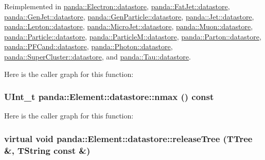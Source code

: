 Reimplemented in \hyperlink{structpanda_1_1Electron_1_1datastore_aca8cd939bbe2edf7b152348364b1ac4c}{panda::Electron::datastore}, \hyperlink{structpanda_1_1FatJet_1_1datastore_a83669574414333b1656878e0ec09c345}{panda::FatJet::datastore}, \hyperlink{structpanda_1_1GenJet_1_1datastore_a38a95477762b562ae4a6f2487e2c26ff}{panda::GenJet::datastore}, \hyperlink{structpanda_1_1GenParticle_1_1datastore_af83451f0c94efe8daeb7769571e81aef}{panda::GenParticle::datastore}, \hyperlink{structpanda_1_1Jet_1_1datastore_ac3a9ecd013ec5d5bf94f71ff013e5491}{panda::Jet::datastore}, \hyperlink{structpanda_1_1Lepton_1_1datastore_a44602d14a45e9a23ffdb02f9dfa7e018}{panda::Lepton::datastore}, \hyperlink{structpanda_1_1MicroJet_1_1datastore_ae893cdc52ad9ae8ffc8a8cea1cac1377}{panda::MicroJet::datastore}, \hyperlink{structpanda_1_1Muon_1_1datastore_aa1c3edc46b6ca55e9b77634cdd0e6684}{panda::Muon::datastore}, \hyperlink{structpanda_1_1Particle_1_1datastore_a09e5a80068f06d0d2118c2596258b8e3}{panda::Particle::datastore}, \hyperlink{structpanda_1_1ParticleM_1_1datastore_a4069b8cdca5715ed6faf0a7907ea8386}{panda::ParticleM::datastore}, \hyperlink{structpanda_1_1Parton_1_1datastore_af82916b07ec783b268c2491cd5b374be}{panda::Parton::datastore}, \hyperlink{structpanda_1_1PFCand_1_1datastore_a117b3a740a7d57118a35816456118685}{panda::PFCand::datastore}, \hyperlink{structpanda_1_1Photon_1_1datastore_a3a0f1b3be1d8cfa4bb5d6a5a6a48997d}{panda::Photon::datastore}, \hyperlink{structpanda_1_1SuperCluster_1_1datastore_a24fa9e942bf46eb8d8a6b9499a8ef231}{panda::SuperCluster::datastore}, and \hyperlink{structpanda_1_1Tau_1_1datastore_af6634c2974f07bafef20c5a49dfd4050}{panda::Tau::datastore}.

Here is the caller graph for this function:\hypertarget{structpanda_1_1Element_1_1datastore_a4791c638f40a6177f52d8d5eb847da32}{
\subsubsection[{nmax}]{\setlength{\rightskip}{0pt plus 5cm}UInt\_\-t panda::Element::datastore::nmax () const}}
\label{structpanda_1_1Element_1_1datastore_a4791c638f40a6177f52d8d5eb847da32}


Here is the caller graph for this function:\hypertarget{structpanda_1_1Element_1_1datastore_a7acb1440122c336e94738695ca5a11bd}{
\subsubsection[{releaseTree}]{\setlength{\rightskip}{0pt plus 5cm}virtual void panda::Element::datastore::releaseTree (TTree \&, \/  TString const \&)}}
\label{structpanda_1_1Element_1_1datastore_a7acb1440122c336e94738695ca5a11bd}


